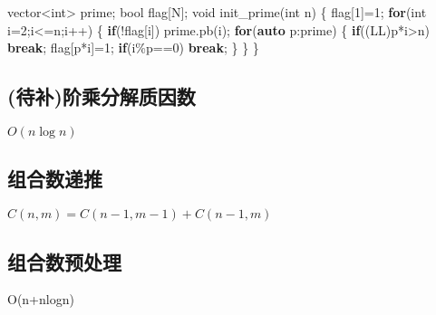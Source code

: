 \documentclass[
]{article}
\newenvironment{Shaded}{}{}
\newcommand{\ControlFlowTok}[1]{\textcolor[rgb]{0.00,0.44,0.13}{\textbf{#1}}}
\newcommand{\DataTypeTok}[1]{\textcolor[rgb]{0.56,0.13,0.00}{#1}}
\newcommand{\DecValTok}[1]{\textcolor[rgb]{0.25,0.63,0.44}{#1}}
\newcommand{\KeywordTok}[1]{\textcolor[rgb]{0.00,0.44,0.13}{\textbf{#1}}}
\newcommand{\NormalTok}[1]{#1}
\begin{document}
\begin{Shaded}
\begin{Highlighting}[]
\NormalTok{vector\textless{}}\DataTypeTok{int}\NormalTok{\textgreater{} prime;}
\DataTypeTok{bool}\NormalTok{ flag[N];}
\DataTypeTok{void}\NormalTok{ init\_prime(}\DataTypeTok{int}\NormalTok{ n)}
\NormalTok{\{}
\NormalTok{    flag[}\DecValTok{1}\NormalTok{]=}\DecValTok{1}\NormalTok{;}
    \ControlFlowTok{for}\NormalTok{(}\DataTypeTok{int}\NormalTok{ i=}\DecValTok{2}\NormalTok{;i\textless{}=n;i++)}
\NormalTok{    \{}
        \ControlFlowTok{if}\NormalTok{(!flag[i]) prime.pb(i);}
        \ControlFlowTok{for}\NormalTok{(}\KeywordTok{auto}\NormalTok{ p:prime)}
\NormalTok{        \{}
            \ControlFlowTok{if}\NormalTok{((LL)p*i\textgreater{}n) }\ControlFlowTok{break}\NormalTok{;}
\NormalTok{            flag[p*i]=}\DecValTok{1}\NormalTok{;}
            \ControlFlowTok{if}\NormalTok{(i\%p==}\DecValTok{0}\NormalTok{) }\ControlFlowTok{break}\NormalTok{;}
\NormalTok{        \}}
\NormalTok{    \}}
\NormalTok{\}}
\end{Highlighting}
\end{Shaded}

\hypertarget{ux5f85ux8865ux9636ux4e58ux5206ux89e3ux8d28ux56e0ux6570}{%
\subsection{(待补)阶乘分解质因数}\label{ux5f85ux8865ux9636ux4e58ux5206ux89e3ux8d28ux56e0ux6570}}

\(O(n\log{n})\)

\hypertarget{ux7ec4ux5408ux6570ux9012ux63a8}{%
\subsection{组合数递推}\label{ux7ec4ux5408ux6570ux9012ux63a8}}

\(C(n,m)=C(n-1,m-1)+C(n-1,m)\)

\hypertarget{ux7ec4ux5408ux6570ux9884ux5904ux7406}{%
\subsection{组合数预处理}\label{ux7ec4ux5408ux6570ux9884ux5904ux7406}}

O(n+nlogn)
\end{document}
